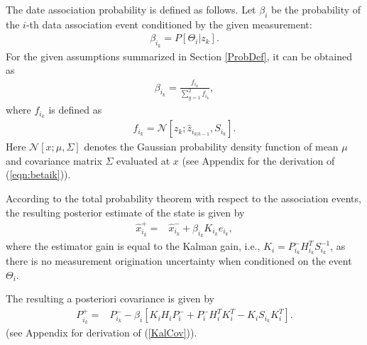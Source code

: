 \documentclass[letterpaper, 10pt, conference]{ieeeconf}
\newcommand{\refeqn}[1]{(\ref{eqn:#1})}
\begin{document}
The date association probability is defined as follows. Let $\beta_i$ be the probability of the $i$-th data association event conditioned by the given measurement:
\begin{align*}
\beta_{i_k} = P[\Theta_i|z_k].
\end{align*}
For the given assumptions summarized in Section \ref{ProbDef}, it can be obtained as
\begin{align}
\beta_{i_k}=\frac{f_{i_k}}{\sum\limits_{y=1}^2 f_{i_k}},\label{eqn:betaik}
\end{align}
where $f_{i_k}$ is defined as
\begin{align}
f_{i_k}=\mathcal{N}[z_{k};\hat z_{i_{k|k-1}},S_{i_k}].
\end{align}
Here $\mathcal{N}[x;\mu,\Sigma]$ denotes the Gaussian probability density function of mean $\mu$ and covariance matrix $\Sigma$ evaluated at $x$ (see Appendix for the derivation of \refeqn{betaik}).

According to the total probability theorem with respect to the association events, the resulting posterior estimate of the state is given by
\begin{align}
\hat x^+_{i_k}=&\hat x^-_{i_k}+\beta_{i_k}K_{i_k}e_{i_k}\label{KalEst},
\end{align}
where the estimator gain is equal to the Kalman gain, i.e., $K_i = P_{i_k}^{-} H_{i_k}^T S_{i_k}^{-1}$, as there is no measurement origination uncertainty when conditioned on the event $\Theta_i$. 

The resulting a posteriori covariance is given by
\begin{align}
\label{KalCov}
P^+_{i_k}=&P^-_{i_k}-\beta_i[K_iH_iP_i^-+P_i^-H_i^TK_i^T-K_iS_{i_k}K_i^T].
\end{align}
(see Appendix for derivation of (\ref{KalCov})).
\end{document}
